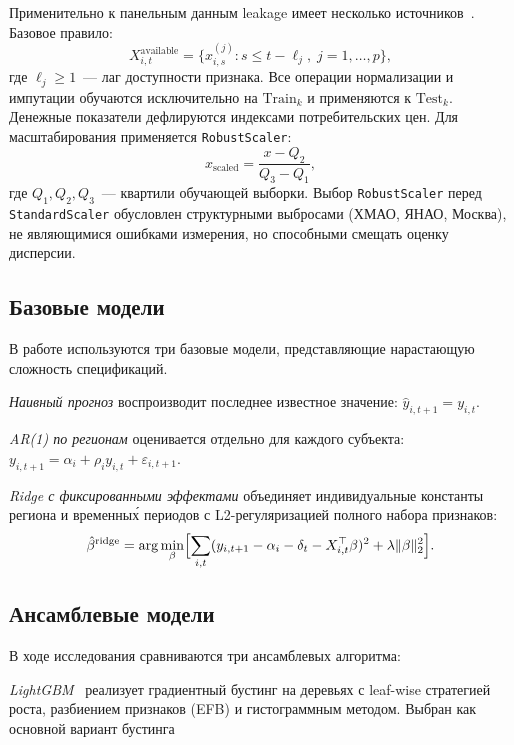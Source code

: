 \documentclass[12pt,a4paper]{article}
\begin{document}
Применительно к панельным данным leakage имеет несколько
источников~\cite{cerqua2025}. Базовое правило:
\begin{equation}
  X^{\text{available}}_{i,t} = \{x^{(j)}_{i,s} : s \le t - \ell_j,\;
  j = 1,\ldots,p\},
\end{equation}
где $\ell_j \ge 1$~--- лаг доступности признака. Все операции нормализации
и импутации обучаются исключительно на $\mathrm{Train}_k$ и применяются
к $\mathrm{Test}_k$. Денежные показатели дефлируются индексами
потребительских цен. Для масштабирования применяется \texttt{RobustScaler}:
\begin{equation}
  x_{\text{scaled}} = \frac{x - Q_2}{Q_3 - Q_1},
\end{equation}
где $Q_1, Q_2, Q_3$~--- квартили обучающей выборки. Выбор \texttt{RobustScaler}
перед \texttt{StandardScaler} обусловлен структурными выбросами
(ХМАО, ЯНАО, Москва), не являющимися ошибками измерения, но способными
смещать оценку дисперсии.

\subsection{Базовые модели}

В работе используются три базовые модели, представляющие нарастающую
сложность спецификаций.

\textit{Наивный прогноз} воспроизводит последнее известное значение:
$\hat{y}_{i,t+1} = y_{i,t}$.

\textit{AR(1) по регионам} оценивается отдельно для каждого субъекта:
$y_{i,t+1} = \alpha_i + \rho_i y_{i,t} + \varepsilon_{i,t+1}$.

\textit{Ridge с фиксированными эффектами} объединяет индивидуальные
константы региона и временны\'{х} периодов с L2-регуляризацией полного
набора признаков:
\begin{equation}
  \hat{\beta}^{\text{ridge}} = \arg\min_{\beta}
  \Bigl[\sum_{i,t}(y_{i,t+1} - \alpha_i - \delta_t - X^\top_{i,t}\beta)^2
  + \lambda\|\beta\|^2_2\Bigr].
\end{equation}

\subsection{Ансамблевые модели}

В ходе исследования сравниваются три ансамблевых алгоритма:

\textit{LightGBM}~\cite{ke2017} реализует градиентный бустинг на
деревьях с leaf-wise стратегией роста, разбиением признаков
(EFB) и гистограммным методом. Выбран как основной вариант бустинга
\end{document}
